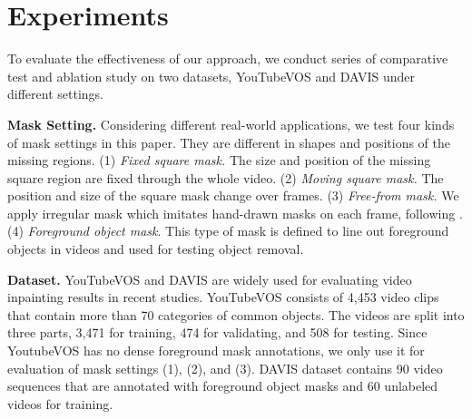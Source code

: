 


\section{Experiments}

To evaluate the effectiveness of our approach, we conduct series of comparative test and ablation study on two datasets, YouTubeVOS \cite{xu2018Youtube} and DAVIS \cite{davis_2017} under different settings.

\noindent \textbf{Mask Setting.} Considering different real-world applications, we test four kinds of mask settings in this paper. 
They are different in shapes and positions of the missing regions. 
(1) \emph{Fixed square mask.} The size and position of the missing square region are fixed through the whole video. 
(2) \emph{Moving square mask.} The position and size of the square mask change over frames. 
(3) \emph{Free-from mask.} We apply irregular mask which imitates hand-drawn masks on each frame, following \cite{liu2018partialinpainting}. 
(4) \emph{Foreground object mask}. This type of mask is defined to line out foreground objects in videos and used for testing object removal.

\noindent\textbf{Dataset.} 
YouTubeVOS and DAVIS are widely used for evaluating video inpainting results in recent studies.
YouTubeVOS consists of 4,453 video clips that contain more than 70 categories of common objects. 
The videos are split into three parts, 3,471 for training, 474 for validating, and 508 for testing. Since YoutubeVOS has no dense foreground mask annotations, we only use it for evaluation of mask settings (1), (2), and (3). 
% 
DAVIS dataset contains 90 video sequences that are annotated with foreground object masks and 60 unlabeled videos for training.



